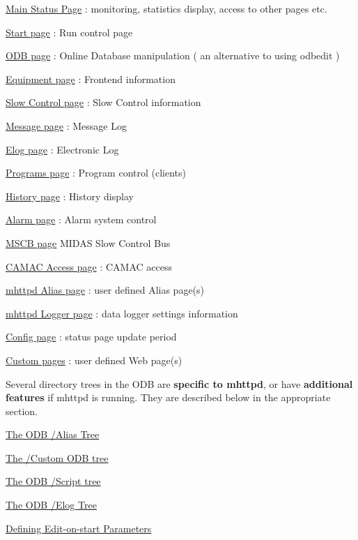 \begin{DoxyItemize}
\item \hyperlink{RC_mhttpd_Main_Status_page}{Main Status Page} : monitoring, statistics display, access to other pages etc.
\item \hyperlink{RC_mhttpd_Start_page}{Start page} : Run control page
\item \hyperlink{RC_mhttpd_ODB_page}{ODB page} : Online Database manipulation ( an alternative to using odbedit )
\item \hyperlink{RC_mhttpd_Equipment_page}{Equipment page} : Frontend information
\item \hyperlink{RC_mhttpd_sc_page}{Slow Control page} : Slow Control information
\item \hyperlink{RC_mhttpd_Message_page}{Message page} : Message Log
\item \hyperlink{RC_mhttpd_Elog_page}{Elog page} : Electronic Log
\item \hyperlink{RC_mhttpd_Program_page}{Programs page} : Program control (clients)
\item \hyperlink{RC_mhttpd_History_page}{History page} : History display
\item \hyperlink{RC_mhttpd_Alarm_page}{Alarm page} : Alarm system control
\item \hyperlink{RC_mhttpd_MSCB_page}{MSCB page} MIDAS Slow Control Bus
\item \hyperlink{RC_mhttpd_CNAF_page}{CAMAC Access page} : CAMAC access
\item \hyperlink{RC_mhttpd_Alias_page}{mhttpd Alias page} : user defined Alias page(s)
\item \hyperlink{RC_mhttpd_Logger_page}{mhttpd Logger page} : data logger settings information
\item \hyperlink{RC_mhttpd_Config_page}{Config page} : status page update period
\item \hyperlink{RC_mhttpd_Custom_page}{Custom pages} : user defined Web page(s)
\end{DoxyItemize}

\label{RC_mhttpd_RC_mhttpd_tree_list}
\hypertarget{RC_mhttpd_RC_mhttpd_tree_list}{}
 Several directory trees in the ODB are {\bfseries  specific to mhttpd}, or have {\bfseries additional} {\bfseries features} if mhttpd is running. They are described below in the appropriate section.
\begin{DoxyItemize}
\item \hyperlink{RC_mhttpd_Alias_page_RC_odb_alias_tree}{The ODB /Alias Tree}
\item \hyperlink{RC_mhttpd_Activate_RC_odb_custom_tree}{The /Custom ODB tree}
\item \hyperlink{RC_mhttpd_defining_script_buttons_RC_odb_script_tree}{The ODB /Script tree}
\item \hyperlink{F_Elog_F_ODB_Elog_Tree}{The ODB /Elog Tree}
\item \hyperlink{RC_customize_ODB_RC_Edit_On_Start}{Defining Edit-\/on-\/start Parameters}
\end{DoxyItemize}



